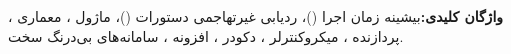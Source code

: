 \vspace{1.0cm}
\noindent
\textbf{واژگان کلیدی:}\quad بیشینه زمان اجرا ()، ردیابی غیرتهاجمی دستورات ()، ماژول ، معماری ، پردازنده ، میکروکنترلر ، دکودر ، افزونه ، سامانه‌های بی‌درنگ سخت.
